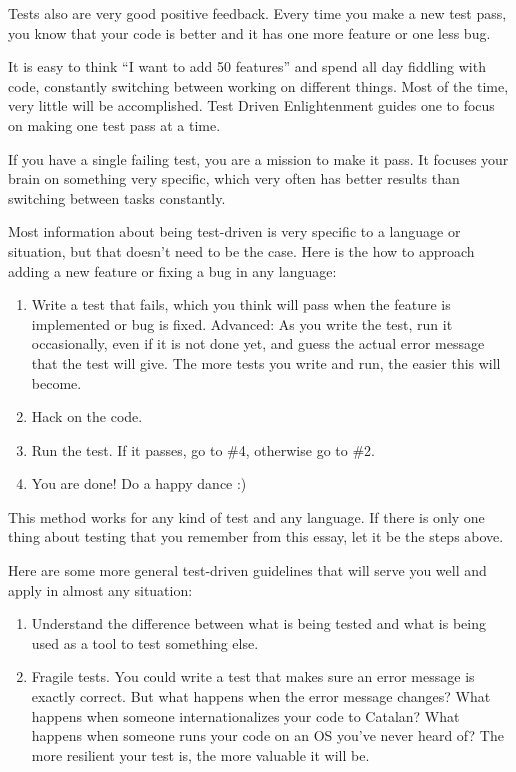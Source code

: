 Tests also are very good positive feedback. Every time you make a new test pass, you know that your code is better and it has one more feature or one less bug.

It is easy to think ``I want to add 50 features'' and spend all day fiddling with code, constantly switching between working on different things. Most of the time, very little will be accomplished. Test Driven Enlightenment guides one to focus on making one test pass at a time.

If you have a single failing test, you are a mission to make it pass. It focuses your brain on something very specific, which very often has better results than switching between tasks constantly.

Most information about being test-driven is very specific to a language or situation, but that doesn't need to be the case. Here is the how to approach adding a new feature or fixing a bug in any language:
\begin{enumerate}
 \item Write a test that fails, which you think will pass when the feature is implemented or bug is fixed. Advanced: As you write the test, run it occasionally, even if it is not done yet, and guess the actual error message that the test will give. The more tests you write and run, the easier this will become.
 \item Hack on the code.
 \item Run the test. If it passes, go to \#4, otherwise go to \#2.
 \item You are done! Do a happy dance :)
\end{enumerate}

This method works for any kind of test and any language. If there is only one thing about testing that you remember from this essay, let it be the steps above.

Here are some more general test-driven guidelines that will serve you well and apply in almost any situation:
\begin{enumerate}
 \item Understand the difference between what is being tested and what is being used as a tool to test something else.
 \item Fragile tests. You could write a test that makes sure an error message is exactly correct. But what happens when the error message changes? What happens when someone internationalizes your code to Catalan? What happens when someone runs your code on an OS you've never heard of? The more resilient your test is, the more valuable it will be.
\end{enumerate}

